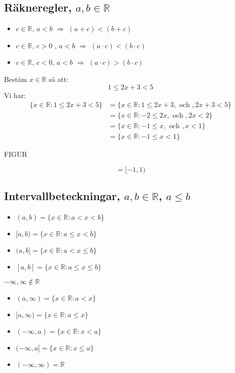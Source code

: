 \subsection{Räkneregler, $a, b \in \mathbb{R}$} %
\label{sub:r_kneregler_}
\begin{itemize}
    \item $c \in \mathbb{R}$, $a < b$ $\Rightarrow$ $(a + c) < (b + c)$
    \item $c \in \mathbb{R}$, $c > 0$ , $a < b$ $\Rightarrow$ $(a \cdot c) < (b \cdot c)$
    \item $c \in \mathbb{R}$, $c < 0$, $a < b$ $\Rightarrow$ $(a \cdot c) > (b \cdot c)$
\end{itemize}
\begin{Ex}
    Bestäm $x \in \mathbb{R}$ så att:
    \[
    1 \le 2x + 3 < 5
    \]
    Vi har:
    \begin{align*}
        \{x \in \mathbb{R}: 1 \le 2x + 3 < 5\} &= \{x \in \mathbb{R}: 1 \le 2x + 3, \mbox{ och }, 2x + 3 < 5\} \\
        &= \{x \in \mathbb{R}: -2 \le 2x, \mbox{ och }, 2x < 2\} \\
        &= \{x \in \mathbb{R}: -1 \le x, \mbox{ och }, x < 1\} \\
        &= \{x \in \mathbb{R}: -1 \le x < 1\}
    \end{align*}
    \begin{center}
        FIGUR
    \end{center}
    \[
    = [-1, 1)
    \]
\end{Ex}
\subsection{Intervallbeteckningar,  $a,b \in \mathbb{R}$, $a \le b$} %
\label{sub:intervallbeteckningar_}
\begin{itemize}
    \item $(a, b) = \{x \in \mathbb{R}: a < x < b\}$
    \item $[a, b) = \{x \in \mathbb{R}: a \le x < b\}$
    \item $(a, b] = \{x \in \mathbb{R}: a < x \le b\}$
    \item $[a, b] = \{x \in \mathbb{R}: a \le x \le b\}$
\end{itemize}
$-\infty, \infty \notin \mathbb{R}$
\begin{itemize}
    \item $(a, \infty) = \{x \in \mathbb{R}: a < x\}$
    \item $[a, \infty) = \{x \in \mathbb{R}: a \le x\}$
    \item $(-\infty, a) = \{x \in \mathbb{R}: x < a\}$
    \item $(-\infty, a] = \{x \in \mathbb{R}: x \le a\}$
    \item $(-\infty, \infty) = \mathbb{R}$
\end{itemize}

